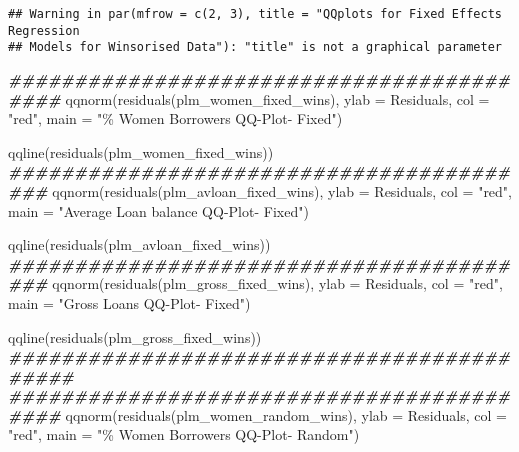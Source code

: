 \documentclass[a4paper,nobind]{templates/ociamthesis}
\newenvironment{Shaded}{\begin{snugshade}}{\end{snugshade}}
\newcommand{\AttributeTok}[1]{\textcolor[rgb]{0.77,0.63,0.00}{#1}}
\newcommand{\DocumentationTok}[1]{\textcolor[rgb]{0.56,0.35,0.01}{\textbf{\textit{#1}}}}
\newcommand{\FunctionTok}[1]{\textcolor[rgb]{0.00,0.00,0.00}{#1}}
\newcommand{\NormalTok}[1]{#1}
\newcommand{\StringTok}[1]{\textcolor[rgb]{0.31,0.60,0.02}{#1}}
\renewenvironment{Shaded}
{
  \vspace{10pt}%
  \begin{snugshade}%
}{%
  \end{snugshade}%
  \vspace{8pt}%
}
\begin{document}
\begin{landscape}
\begin{verbatim}
## Warning in par(mfrow = c(2, 3), title = "QQplots for Fixed Effects Regression
## Models for Winsorised Data"): "title" is not a graphical parameter
\end{verbatim}

\begin{Shaded}
\begin{Highlighting}[]
\DocumentationTok{\#\#\#\#\#\#\#\#\#\#\#\#\#\#\#\#\#\#\#\#\#\#\#\#\#\#\#\#\#\#\#\#\#\#\#\#\#\#\#\#\#\#}
\FunctionTok{qqnorm}\NormalTok{(}\FunctionTok{residuals}\NormalTok{(plm\_women\_fixed\_wins), }\AttributeTok{ylab =} \StringTok{\textquotesingle{}Residuals\textquotesingle{}}\NormalTok{, }\AttributeTok{col =} \StringTok{"red"}\NormalTok{, }
       \AttributeTok{main =} \StringTok{"\% Women Borrowers QQ{-}Plot{-} Fixed"}\NormalTok{)}

\FunctionTok{qqline}\NormalTok{(}\FunctionTok{residuals}\NormalTok{(plm\_women\_fixed\_wins))}
\DocumentationTok{\#\#\#\#\#\#\#\#\#\#\#\#\#\#\#\#\#\#\#\#\#\#\#\#\#\#\#\#\#\#\#\#\#\#\#\#\#\#\#\#\#}
\FunctionTok{qqnorm}\NormalTok{(}\FunctionTok{residuals}\NormalTok{(plm\_avloan\_fixed\_wins), }\AttributeTok{ylab =} \StringTok{\textquotesingle{}Residuals\textquotesingle{}}\NormalTok{, }\AttributeTok{col =} \StringTok{"red"}\NormalTok{, }
       \AttributeTok{main =} \StringTok{"Average Loan balance QQ{-}Plot{-} Fixed"}\NormalTok{)}

\FunctionTok{qqline}\NormalTok{(}\FunctionTok{residuals}\NormalTok{(plm\_avloan\_fixed\_wins))}
\DocumentationTok{\#\#\#\#\#\#\#\#\#\#\#\#\#\#\#\#\#\#\#\#\#\#\#\#\#\#\#\#\#\#\#\#\#\#\#\#\#\#\#\#\#}
\FunctionTok{qqnorm}\NormalTok{(}\FunctionTok{residuals}\NormalTok{(plm\_gross\_fixed\_wins), }\AttributeTok{ylab =} \StringTok{\textquotesingle{}Residuals\textquotesingle{}}\NormalTok{, }\AttributeTok{col =} \StringTok{"red"}\NormalTok{, }
       \AttributeTok{main =} \StringTok{"Gross Loans QQ{-}Plot{-} Fixed"}\NormalTok{)}

\FunctionTok{qqline}\NormalTok{(}\FunctionTok{residuals}\NormalTok{(plm\_gross\_fixed\_wins))}
\DocumentationTok{\#\#\#\#\#\#\#\#\#\#\#\#\#\#\#\#\#\#\#\#\#\#\#\#\#\#\#\#\#\#\#\#\#\#\#\#\#\#\#\#\#\#\#}
\DocumentationTok{\#\#\#\#\#\#\#\#\#\#\#\#\#\#\#\#\#\#\#\#\#\#\#\#\#\#\#\#\#\#\#\#\#\#\#\#\#\#\#\#\#\#}
\FunctionTok{qqnorm}\NormalTok{(}\FunctionTok{residuals}\NormalTok{(plm\_women\_random\_wins), }\AttributeTok{ylab =} \StringTok{\textquotesingle{}Residuals\textquotesingle{}}\NormalTok{, }\AttributeTok{col =} \StringTok{"red"}\NormalTok{, }
       \AttributeTok{main =} \StringTok{"\% Women Borrowers QQ{-}Plot{-} Random"}\NormalTok{)}


\end{Highlighting}
\end{Shaded}
\end{landscape}
\end{document}
